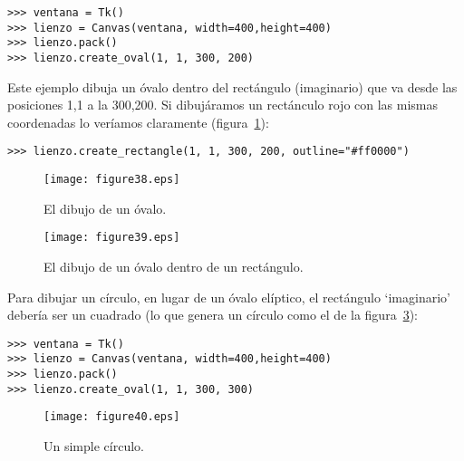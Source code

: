 \begin{listing}
\begin{verbatim}
>>> ventana = Tk()
>>> lienzo = Canvas(ventana, width=400,height=400)
>>> lienzo.pack()
>>> lienzo.create_oval(1, 1, 300, 200)
\end{verbatim}
\end{listing}

Este ejemplo dibuja un óvalo dentro del rectángulo (imaginario) que va desde las posiciones 1,1 a la 300,200.  Si dibujáramos un rectánculo rojo con las mismas coordenadas lo veríamos claramente (figura~\ref{fig38}):

\begin{listing}
\begin{verbatim}
>>> lienzo.create_rectangle(1, 1, 300, 200, outline="#ff0000")
\end{verbatim}
\end{listing}

\begin{figure}
\begin{center}
\texttt{[image: figure38.eps]}
\end{center}
\caption{El dibujo de un óvalo.}\label{fig38}
\end{figure}

\begin{figure}
\begin{center}
\texttt{[image: figure39.eps]}
\end{center}
\caption{El dibujo de un óvalo dentro de un rectángulo.}\label{fig39}
\end{figure}

\noindent
Para dibujar un círculo, en lugar de un óvalo elíptico, el rectángulo `imaginario' debería ser un cuadrado (lo que genera un círculo como el de la figura~\ref{fig40}):

\begin{listing}
\begin{verbatim}
>>> ventana = Tk()
>>> lienzo = Canvas(ventana, width=400,height=400)
>>> lienzo.pack()
>>> lienzo.create_oval(1, 1, 300, 300)
\end{verbatim}
\end{listing}

\begin{figure}
\begin{center}
\texttt{[image: figure40.eps]}
\end{center}
\caption{Un simple círculo.}\label{fig40}
\end{figure}

